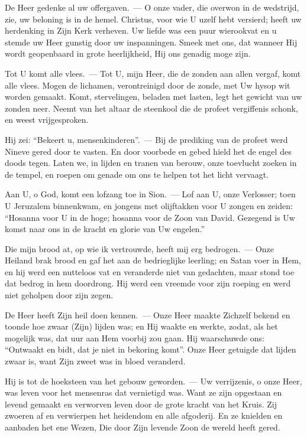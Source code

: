 \documentclass[12pt,twoside,a5paper]{article}
\begin{document}
\begin{halfparskip}
  De Heer gedenke al uw offergaven.~--- O onze vader, die overwon in de wedstrijd, zie, uw beloning is in de hemel. Christus, voor wie U uzelf hebt versierd; heeft uw herdenking in Zijn Kerk verheven. Uw liefde was een puur wierookvat en u stemde uw Heer gunstig door uw inspanningen. Smeek met ons, dat wanneer Hij wordt geopenbaard in grote heerlijkheid, Hij ons genadig moge zijn.

  Tot U komt alle vlees.~--- Tot U, mijn Heer, die de zonden aan allen vergaf, komt alle vlees. Mogen de lichamen, verontreinigd door de zonde, met Uw hysop wit worden gemaakt. Komt, stervelingen, beladen met lasten, legt het gewicht van uw zonden neer. Neemt van het altaar de steenkool die de profeet vergiffenis schonk, en weest vrijgesproken.

  Hij zei: ``Bekeert u, mensenkinderen''.~--- Bij de prediking van de profeet werd Nineve gered door te vasten. En door voorbede en gebed hield het de engel des doods tegen. Laten we, in lijden en tranen van berouw, onze toevlucht zoeken in de tempel, en roepen om genade om ons te helpen tot het licht vervaagt.

  Aan U, o God, komt een lofzang toe in Sion.~--- Lof aan U, onze Verlosser; toen U Jeruzalem binnenkwam, en jongens met olijftakken voor U zongen en zeiden: ``Hosanna voor U in de hoge; hosanna voor de Zoon van David. Gezegend is Uw komst naar ons in de kracht en glorie van Uw engelen.''

  Die mijn brood at, op wie ik vertrouwde, heeft mij erg bedrogen.~--- Onze Heiland brak brood en gaf het aan de bedrieglijke leerling; en Satan voer in Hem, en hij werd een nutteloos vat en veranderde niet van gedachten, maar stond toe dat bedrog in hem doordrong. Hij werd een vreemde voor zijn roeping en werd niet geholpen door zijn zegen.

  De Heer heeft Zijn heil doen kennen.~--- Onze Heer maakte Zichzelf bekend en toonde hoe zwaar (Zijn) lijden was; en Hij waakte en werkte, zodat, als het mogelijk was, dat uur aan Hem voorbij zou gaan. Hij waarschuwde ons: ``Ontwaakt en bidt, dat je niet in bekoring komt''. Onze Heer getuigde dat lijden zwaar is, want Zijn zweet was in bloed veranderd.

  Hij is tot de hoeksteen van het gebouw geworden.~--- Uw verrijzenis, o onze Heer, was leven voor het mensenras dat vernietigd was. Want ze zijn opgestaan en levend gemaakt en verworven leven door de grote kracht van het Kruis. Zij zwoeren af en verwierpen het heidendom en alle afgoderij. En ze knielden en aanbaden het ene Wezen, Die door Zijn levende Zoon de wereld heeft gered.


\end{halfparskip}
\end{document}
